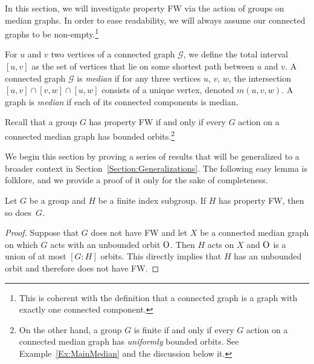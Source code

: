\label{Section:Median}
In this section, we will investigate property FW via the action of groups on median graphs.
In order to ease readability, we will always assume our connected graphs to be non-empty.\footnote{This is coherent with the definition that a connected graph is a graph with exactly one connected component.}

For $u$ and $v$ two vertices of a connected graph $\mathcal G$, we define the total interval $[u,v]$ as the set of vertices that lie on some shortest path between $u$ and $v$.
A connected graph $\mathcal G$ is \emph{median} if for any three vertices $u$, $v$, $w$, the intersection $[u,v]\cap[v,w]\cap[u,w]$ consists of a unique vertex, denoted $m(u,v,w)$.
A graph is \emph{median} if each of its connected components is median.

Recall that a group $G$ has property FW if and only if every $G$ action on a connected median graph has bounded orbits.\footnote{On the other hand, a group $G$ is finite if and only if every $G$ action on a connected median graph has \emph{uniformly} bounded orbits. See Example~\ref{Ex:MainMedian} and the discussion below it.}

We begin this section by proving a series of results that will be generalized to a broader context in Section~\ref{Section:Generalizations}.
The following easy lemma is folklore, and we provide a proof of it only for the sake of completeness.
\begin{lem}\label{Lemma:Subgroup}
Let $G$ be a group and $H$ be a finite index subgroup.
If $H$ has property FW, then so does~$G$.
\end{lem}
\begin{proof}
Suppose that $G$ does not have FW and let $X$ be a connected median graph on which $G$ acts with an unbounded orbit $\operatorname{O}$.
Then $H$ acts on $X$ and $\operatorname{O}$ is a union of at most $[G:H]$ orbits. This directly implies that $H$ has an unbounded orbit and therefore does not have FW.
\end{proof}

